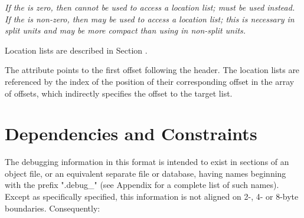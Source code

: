 \textit{If the \HFNoffsetentrycount{} is zero, then \DWFORMloclistx{} cannot 
be used to access a location list; \DWFORMsecoffset{} must be used 
instead. If the \HFNoffsetentrycount{} is non-zero, then \DWFORMloclistx{} 
may be used to access a location list; this is necessary in split units and
may be more compact than using \DWFORMsecoffset{}
\bb\eb
in non-split units.}

Location lists are described in Section .
\db

The \DWATloclistsbase{} attribute points to the first offset 
following the header. The location lists are referenced
by the index of the position of their corresponding offset in the
array of offsets, which indirectly specifies the offset to the
target list.

\section{Dependencies and Constraints}
\label{datarep:dependenciesandconstraints}
The debugging information in this format is intended to
exist in sections of an object file, or an equivalent
separate file or database, having names beginning with
the prefix ".debug\_" (see Appendix 
for a complete list of such names). 
Except as specifically specified, this information is not 
aligned on 2-, 4- or 8-byte boundaries. Consequently:

